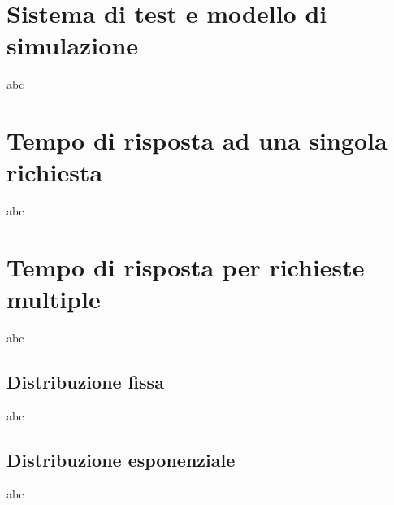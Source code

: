 \section{Sistema di test e modello di simulazione}

abc

\section{Tempo di risposta ad una singola richiesta}

abc

\section{Tempo di risposta per richieste multiple}

abc

\subsection{Distribuzione fissa}

abc

\subsection{Distribuzione esponenziale}

abc